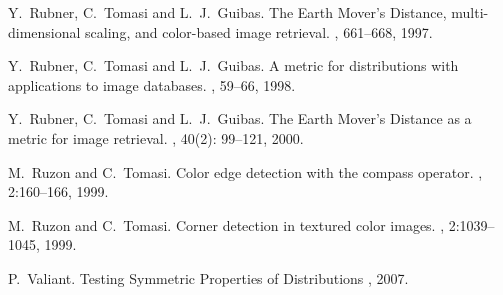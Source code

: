 \documentclass[11pt]{article}
\begin{document}
\begin{thebibliography}{X}
Y.~Rubner, C.~Tomasi and L.~J.~Guibas.
\newblock The Earth Mover's Distance, multi-dimensional scaling, and color-based
                                        image retrieval.
, 661--668, 1997.

Y.~Rubner, C.~Tomasi and L.~J.~Guibas.
\newblock A metric for distributions with applications to image databases.
, 59--66, 1998.

Y.~Rubner, C.~Tomasi and L.~J.~Guibas.
\newblock The Earth Mover's Distance as a metric for image retrieval.
, 40(2): 99--121, 2000.

M.~Ruzon and C.~Tomasi.
\newblock Color edge detection with the compass operator.
, 2:160--166, 1999.

M.~Ruzon and C.~Tomasi.
\newblock Corner detection in textured color images.
, 2:1039--1045, 1999.

P.~Valiant.
\newblock Testing Symmetric Properties of Distributions
, 2007.

\end{thebibliography}
\end{document}
